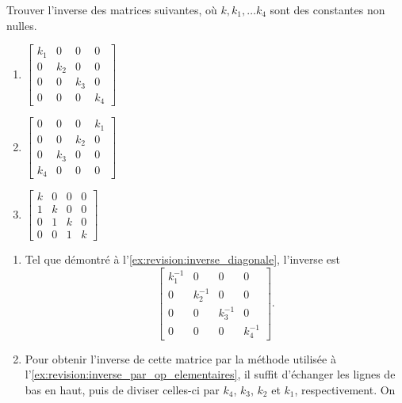 \begin{exercice}
  Trouver l'inverse des matrices suivantes, où $k, k_1, \dots k_4$
  sont des constantes non nulles.
  \begin{multicols}{3}
    \begin{enumerate}
    \item $%
      \begin{bmatrix}
        k_1 & 0 & 0 & 0 \\
        0 & k_2 & 0 & 0 \\
        0 & 0 & k_3 & 0 \\
        0 & 0 & 0 & k_4
      \end{bmatrix}$
    \item $%
      \begin{bmatrix}
        0 & 0 & 0 & k_1 \\
        0 & 0 & k_2 & 0 \\
        0 & k_3 & 0 & 0 \\
        k_4 & 0 & 0 & 0
      \end{bmatrix}$
    \item $%
      \begin{bmatrix}
        k & 0 & 0 & 0 \\
        1 & k & 0 & 0 \\
        0 & 1 & k & 0 \\
        0 & 0 & 1 & k
      \end{bmatrix}$
    \end{enumerate}
  \end{multicols}
  \begin{sol}
    \begin{enumerate}
    \item Tel que démontré à l'\autoref{ex:revision:inverse_diagonale},
      l'inverse est
      \begin{displaymath}
        \begin{bmatrix}
          k_1^{-1} & 0 & 0 & 0 \\
          0 & k_2^{-1} & 0 & 0 \\
          0 & 0 & k_3^{-1} & 0 \\
          0 & 0 & 0 & k_4^{-1}
        \end{bmatrix}.
      \end{displaymath}
    \item Pour obtenir l'inverse de cette matrice par la méthode
      utilisée à l'\autoref{ex:revision:inverse_par_op_elementaires},
      il suffit d'échanger les lignes de bas en haut, puis de diviser
      celles-ci par $k_4$, $k_3$, $k_2$ et $k_1$, respectivement. On

\end{enumerate}
\end{sol}
\end{exercice}
